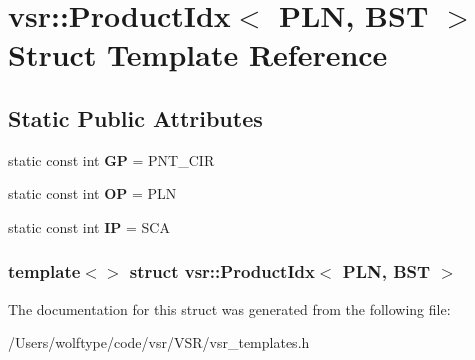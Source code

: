 \hypertarget{structvsr_1_1_product_idx_3_01_p_l_n_00_01_b_s_t_01_4}{\section{vsr\-:\-:Product\-Idx$<$ P\-L\-N, B\-S\-T $>$ Struct Template Reference}
\label{structvsr_1_1_product_idx_3_01_p_l_n_00_01_b_s_t_01_4}
}
\subsection*{Static Public Attributes}
\begin{DoxyCompactItemize}
\item 
\hypertarget{structvsr_1_1_product_idx_3_01_p_l_n_00_01_b_s_t_01_4_af1975328b184fabf5de8fc75de4944b9}{static const int {\bfseries G\-P} = P\-N\-T\-\_\-\-C\-I\-R}\label{structvsr_1_1_product_idx_3_01_p_l_n_00_01_b_s_t_01_4_af1975328b184fabf5de8fc75de4944b9}

\item 
\hypertarget{structvsr_1_1_product_idx_3_01_p_l_n_00_01_b_s_t_01_4_a45586cf5b434399e1c39d1e7504795a7}{static const int {\bfseries O\-P} = P\-L\-N}\label{structvsr_1_1_product_idx_3_01_p_l_n_00_01_b_s_t_01_4_a45586cf5b434399e1c39d1e7504795a7}

\item 
\hypertarget{structvsr_1_1_product_idx_3_01_p_l_n_00_01_b_s_t_01_4_a55160a3f42fd4c6b683bbb6100de7aa4}{static const int {\bfseries I\-P} = S\-C\-A}\label{structvsr_1_1_product_idx_3_01_p_l_n_00_01_b_s_t_01_4_a55160a3f42fd4c6b683bbb6100de7aa4}

\end{DoxyCompactItemize}
\subsubsection*{template$<$$>$ struct vsr\-::\-Product\-Idx$<$ P\-L\-N, B\-S\-T $>$}



The documentation for this struct was generated from the following file\-:\begin{DoxyCompactItemize}
\item 
/\-Users/wolftype/code/vsr/\-V\-S\-R/vsr\-\_\-templates.\-h\end{DoxyCompactItemize}
